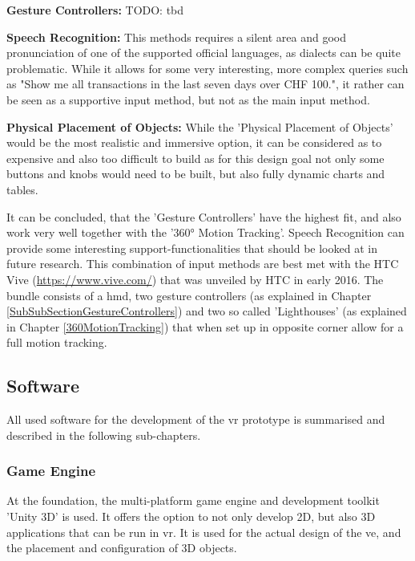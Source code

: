 \textbf{Gesture Controllers:}
TODO: tbd

\textbf{Speech Recognition:}
This methods requires a silent area and good pronunciation of one of the supported official languages, as dialects can be quite problematic. While it allows for some very interesting, more complex queries such as "Show me all transactions in the last seven days over CHF 100.", it rather can be seen as a supportive input method, but not as the main input method.

\textbf{Physical Placement of Objects:}
While the 'Physical Placement of Objects' would be the most realistic and immersive option, it can be considered as to expensive and also too difficult to build as for this design goal not only some buttons and knobs would need to be built, but also fully dynamic charts and tables.


It can be concluded, that the 'Gesture Controllers' have the highest fit, and also work very well together with the '360° Motion Tracking'. Speech Recognition can provide some interesting support-functionalities that should be looked at in future research. \newline
This combination of input methods are best met with the HTC Vive (\url{https://www.vive.com/}) that was unveiled by HTC in early 2016. The bundle consists of a \gls{hmd}, two gesture controllers (as explained in Chapter \ref{SubSubSectionGestureControllers}) and two so called 'Lighthouses' (as explained in Chapter \ref{360MotionTracking}) that when set up in opposite corner allow for a full motion tracking.




\subsection{Software}

All used software for the development of the \gls{vr} prototype is summarised and described in the following sub-chapters.


\subsubsection{Game Engine}
At the foundation, the multi-platform game engine and development toolkit 'Unity 3D' is used. It offers the option to not only develop 2D, but also 3D applications that can be run in \gls{vr}. It is used for the actual design of the \gls{ve}, and the placement and configuration of 3D objects.

